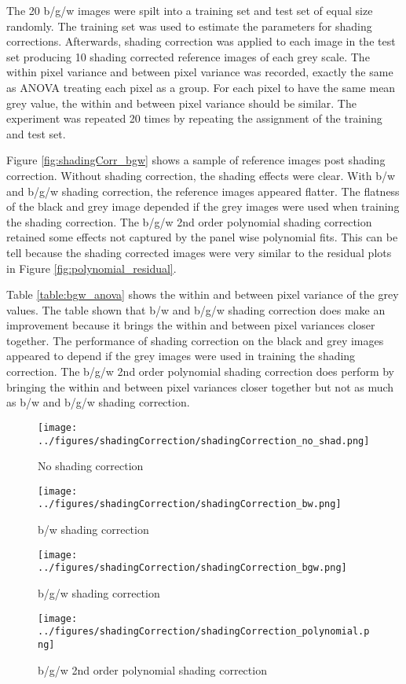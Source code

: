 \documentclass[a4paper]{proc}
\begin{document}
The 20 b/g/w images were spilt into a training set and test set of equal size randomly. The training set was used to estimate the parameters for shading corrections. Afterwards, shading correction was applied to each image in the test set producing 10 shading corrected reference images of each grey scale. The within pixel variance and between pixel variance was recorded, exactly the same as ANOVA treating each pixel as a group. For each pixel to have the same mean grey value, the within and between pixel variance should be similar. The experiment was repeated 20 times by repeating the assignment of the training and test set.

Figure \ref{fig:shadingCorr_bgw} shows a sample of reference images post shading correction. Without shading correction, the shading effects were clear. With b/w and b/g/w shading correction, the reference images appeared flatter. The flatness of the black and grey image depended if the grey images were used when training the shading correction. The b/g/w 2nd order polynomial shading correction retained some effects not captured by the panel wise polynomial fits. This can be tell because the shading corrected images were very similar to the residual plots in Figure \ref{fig:polynomial_residual}.

Table \ref{table:bgw_anova} shows the within and between pixel variance of the grey values. The table shown that b/w and b/g/w shading correction does make an improvement because it brings the within and between pixel variances closer together. The performance of shading correction on the black and grey images appeared to depend if the grey images were used in training the shading correction. The b/g/w 2nd order polynomial shading correction does perform by bringing the within and between pixel variances closer together but not as much as b/w and b/g/w shading correction.

\begin{figure*}
	\centering
	\begin{subfigure}{\textwidth}
		\centering
		\texttt{[image: ../figures/shadingCorrection/shadingCorrection\_no\_shad.png]}
		\caption{No shading correction}
	\end{subfigure}
	\begin{subfigure}{\textwidth}
		\centering
		\texttt{[image: ../figures/shadingCorrection/shadingCorrection\_bw.png]}
		\caption{b/w shading correction}
	\end{subfigure}
	\begin{subfigure}{\textwidth}
		\centering
		\texttt{[image: ../figures/shadingCorrection/shadingCorrection\_bgw.png]}
		\caption{b/g/w shading correction}
	\end{subfigure}
		\begin{subfigure}{\textwidth}
		\centering
		\texttt{[image: ../figures/shadingCorrection/shadingCorrection\_polynomial.png]}
		\caption{b/g/w 2nd order polynomial shading correction}
	\end{subfigure}
	\caption{Shading correction applied on reference images from a test set. A training set was used to train the shading correction.}
	\label{fig:shadingCorr_bgw}
\end{figure*}
\end{document}

